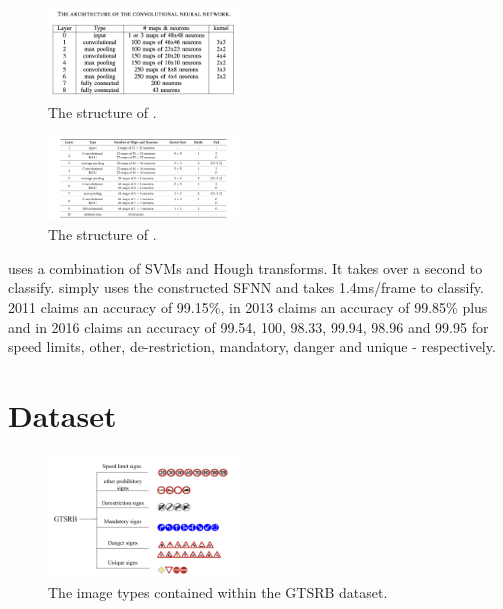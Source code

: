 \documentclass[conference]{IEEEtran}
\begin{document}
\begin{figure}[ht]
    \centering
    \includegraphics[width=0.45\textwidth]{network_structure.png}
    \caption{The structure of \cite{Paper1}.}
    \label{fig:network_structure}
\end{figure}

\begin{figure}[ht]
    \centering
    \includegraphics[width=0.45\textwidth]{zhang_network_structure.png}
    \caption{The structure of \cite{ZhangsMainPaper}.}
    \label{fig:zhang_structure}
\end{figure}

\cite{Paper2} uses a combination of SVMs and Hough transforms. It takes over a second to classify. \cite{Paper3} simply uses the constructed SFNN and takes 1.4ms/frame to classify. \cite{Paper1} 2011 claims an accuracy of 99.15\%, \cite{Paper2} in 2013 claims an accuracy of 99.85\% plus and \cite{Paper3} in 2016 claims an accuracy of 99.54, 100, 98.33, 99.94, 98.96 and 99.95 for speed limits, other, de-restriction, mandatory, danger and unique - respectively.

\section{Dataset}

\begin{figure}[ht]
    \centering
    \includegraphics[width=0.45\textwidth]{traffic_signs.png}
    \caption{The image types contained within the GTSRB dataset.}
    \label{fig:zhang_structure}
\end{figure}
\end{document}
